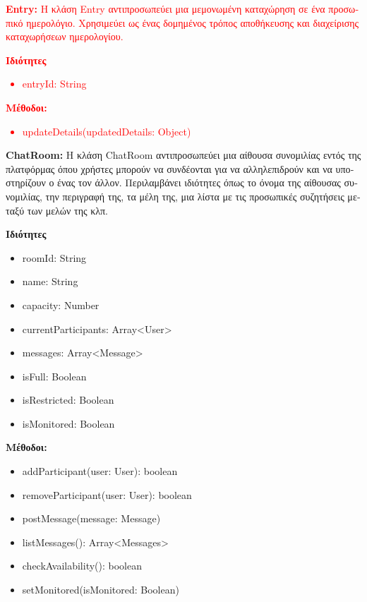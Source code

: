 \documentclass{article}
\begin{document}
\textcolor{red}{\textbf{Entry:} \textgreek{Η κλάση} Entry \textgreek{αντιπροσωπεύει μια μεμονωμένη καταχώρηση σε ένα προσωπικό ημερολόγιο. Χρησιμεύει ως ένας δομημένος τρόπος αποθήκευσης και διαχείρισης καταχωρήσεων ημερολογίου.}}
\newline
\newline

\textcolor{red}{\textbf{\textgreek{Ιδιότητες}}
\begin{itemize}
    \item entryId: String
\end{itemize}
\textbf{\textgreek{Μέθοδοι:}}
\begin{itemize}
    \item updateDetails(updatedDetails: Object)
\end{itemize}}


\textbf{ChatRoom:} \textgreek{Η κλάση} ChatRoom \textgreek{αντιπροσωπεύει μια αίθουσα συνομιλίας εντός της πλατφόρμας όπου χρήστες μπορούν να συνδέονται για να αλληλεπιδρούν και να υποστηρίζουν ο ένας τον άλλον. Περιλαμβάνει ιδιότητες όπως το όνομα της αίθουσας συνομιλίας, την περιγραφή της, τα μέλη της, μια λίστα με τις προσωπικές συζητήσεις μεταξύ των μελών της κλπ.}
\newline
\newline

\textbf{\textgreek{Ιδιότητες}}
\begin{itemize}
    \item roomId: String
    \item name: String
    \item capacity: Number
    \item currentParticipants: Array<User>
    \item messages: Array<Message>
    \item isFull: Boolean
    \item isRestricted: Boolean
    \item isMonitored: Boolean
\end{itemize}
\textbf{\textgreek{Μέθοδοι:}}
\begin{itemize}
    \item addParticipant(user: User): boolean
    \item removeParticipant(user: User): boolean
    \item postMessage(message: Message)
    \item listMessages(): Array<Messages>
    \item checkAvailability(): boolean
    \item setMonitored(isMonitored: Boolean)
\end{itemize}
\end{document}
